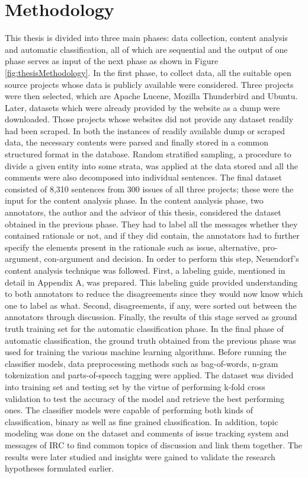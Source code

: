 \documentclass[a4paper,12pt,twoside]{report}
\begin{document}
\section{Methodology}
This thesis is divided into three main phases: data collection, content analysis and automatic classification, all of which are sequential and the output of one phase serves as input of the next phase as shown in Figure \ref{fig:thesisMethodology}. In the first phase, to collect data, all the suitable open source projects whose data is publicly available were considered. Three projects were then selected, which are Apache Lucene, Mozilla Thunderbird and Ubuntu. Later, datasets which were already provided by the website as a dump were downloaded. Those projects whose websites did not provide any dataset readily had been scraped. In both the instances of readily available dump or scraped data, the necessary contents were parsed and finally stored in a common structured format in the database. Random stratified sampling, a procedure to divide a given entity into some strata, was applied at the data stored and all the comments were also decomposed into individual sentences. The final dataset consisted of 8,310 sentences from 300 issues of all three projects; these were the input for the content analysis phase. 
\newline \newline
In the content analysis phase, two annotators, the author and the advisor of this thesis, considered the dataset obtained in the previous phase. They had to label all the messages whether they contained rationale or not, and if they did contain, the annotators had to further specify the elements present in the rationale such as issue, alternative, pro-argument, con-argument and decision. In order to perform this step, Neuendorf's \cite{Neuendorf2009a} content analysis technique was followed. First, a labeling guide, mentioned in detail in Appendix A, was prepared. This labeling guide provided understanding to both annotators to reduce the disagreements since they would now know which one to label as what. Second, disagreements, if any, were sorted out between the annotators through discussion. Finally, the results of this stage served as ground truth training set for the automatic classification phase.  
\newline \newline
In the final phase of automatic classification, the ground truth obtained from the previous phase was used for training the various machine learning algorithms. Before running the classifier models, data preprocessing methods such as bag-of-words, n-gram tokenization and parts-of-speech tagging were applied. The dataset was divided into training set and testing set by the virtue of performing k-fold cross validation to test the accuracy of the model and retrieve the best performing ones. The classifier models were capable of performing both kinds of classification, binary as well as fine grained classification. In addition, topic modeling was done on the dataset and comments of issue tracking system and messages of \acs{IRC} to find common topics of discussion and link them together. The results were later studied and insights were gained to validate the research hypotheses formulated earlier. 
\end{document}
